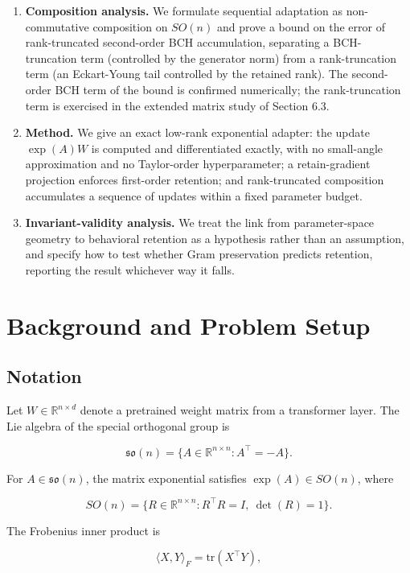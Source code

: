 \documentclass[
]{article}
\providecommand{\tightlist}{%
  \setlength{\itemsep}{0pt}\setlength{\parskip}{0pt}}
\begin{document}
\begin{enumerate}
\def\labelenumi{\arabic{enumi}.}
\tightlist
\item
  \textbf{Composition analysis.} We formulate sequential adaptation as non-commutative composition on \(SO(n)\) and prove a bound on the error of rank-truncated second-order BCH accumulation, separating a BCH-truncation term (controlled by the generator norm) from a rank-truncation term (an Eckart-Young tail controlled by the retained rank). The second-order BCH term of the bound is confirmed numerically; the rank-truncation term is exercised in the extended matrix study of Section 6.3.
\item
  \textbf{Method.} We give an exact low-rank exponential adapter: the update \(\exp(A)W\) is computed and differentiated exactly, with no small-angle approximation and no Taylor-order hyperparameter; a retain-gradient projection enforces first-order retention; and rank-truncated composition accumulates a sequence of updates within a fixed parameter budget.
\item
  \textbf{Invariant-validity analysis.} We treat the link from parameter-space geometry to behavioral retention as a hypothesis rather than an assumption, and specify how to test whether Gram preservation predicts retention, reporting the result whichever way it falls.
\end{enumerate}

\section{Background and Problem Setup}\label{background-and-problem-setup}

\subsection{Notation}\label{notation}

Let \(W\in\mathbb{R}^{n\times d}\) denote a pretrained weight matrix from a transformer layer. The Lie algebra of the special orthogonal group is

\[
\mathfrak{so}(n)=\{A\in\mathbb{R}^{n\times n}: A^\top=-A\}.
\]

For \(A\in\mathfrak{so}(n)\), the matrix exponential satisfies \(\exp(A)\in SO(n)\), where

\[
SO(n)=\{R\in\mathbb{R}^{n\times n}: R^\top R=I,\ \det(R)=1\}.
\]

The Frobenius inner product is

\[
\langle X,Y\rangle_F=\mathrm{tr}(X^\top Y),
\]
\end{document}

